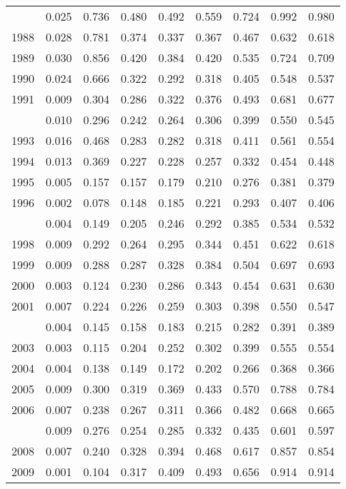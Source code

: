 \documentclass[
]{article}
\begin{document}
\begin{longtable}[t]{lrrrrrrrr}
\endfoot
\bottomrule
\endlastfoot
1987 & 0.025 & 0.736 & 0.480 & 0.492 & 0.559 & 0.724 & 0.992 & 0.980\\
1988 & 0.028 & 0.781 & 0.374 & 0.337 & 0.367 & 0.467 & 0.632 & 0.618\\
1989 & 0.030 & 0.856 & 0.420 & 0.384 & 0.420 & 0.535 & 0.724 & 0.709\\
1990 & 0.024 & 0.666 & 0.322 & 0.292 & 0.318 & 0.405 & 0.548 & 0.537\\
1991 & 0.009 & 0.304 & 0.286 & 0.322 & 0.376 & 0.493 & 0.681 & 0.677\\
\addlinespace
1992 & 0.010 & 0.296 & 0.242 & 0.264 & 0.306 & 0.399 & 0.550 & 0.545\\
1993 & 0.016 & 0.468 & 0.283 & 0.282 & 0.318 & 0.411 & 0.561 & 0.554\\
1994 & 0.013 & 0.369 & 0.227 & 0.228 & 0.257 & 0.332 & 0.454 & 0.448\\
1995 & 0.005 & 0.157 & 0.157 & 0.179 & 0.210 & 0.276 & 0.381 & 0.379\\
1996 & 0.002 & 0.078 & 0.148 & 0.185 & 0.221 & 0.293 & 0.407 & 0.406\\
\addlinespace
1997 & 0.004 & 0.149 & 0.205 & 0.246 & 0.292 & 0.385 & 0.534 & 0.532\\
1998 & 0.009 & 0.292 & 0.264 & 0.295 & 0.344 & 0.451 & 0.622 & 0.618\\
1999 & 0.009 & 0.288 & 0.287 & 0.328 & 0.384 & 0.504 & 0.697 & 0.693\\
2000 & 0.003 & 0.124 & 0.230 & 0.286 & 0.343 & 0.454 & 0.631 & 0.630\\
2001 & 0.007 & 0.224 & 0.226 & 0.259 & 0.303 & 0.398 & 0.550 & 0.547\\
\addlinespace
2002 & 0.004 & 0.145 & 0.158 & 0.183 & 0.215 & 0.282 & 0.391 & 0.389\\
2003 & 0.003 & 0.115 & 0.204 & 0.252 & 0.302 & 0.399 & 0.555 & 0.554\\
2004 & 0.004 & 0.138 & 0.149 & 0.172 & 0.202 & 0.266 & 0.368 & 0.366\\
2005 & 0.009 & 0.300 & 0.319 & 0.369 & 0.433 & 0.570 & 0.788 & 0.784\\
2006 & 0.007 & 0.238 & 0.267 & 0.311 & 0.366 & 0.482 & 0.668 & 0.665\\
\addlinespace
2007 & 0.009 & 0.276 & 0.254 & 0.285 & 0.332 & 0.435 & 0.601 & 0.597\\
2008 & 0.007 & 0.240 & 0.328 & 0.394 & 0.468 & 0.617 & 0.857 & 0.854\\
2009 & 0.001 & 0.104 & 0.317 & 0.409 & 0.493 & 0.656 & 0.914 & 0.914\\

\end{longtable}
\end{document}
